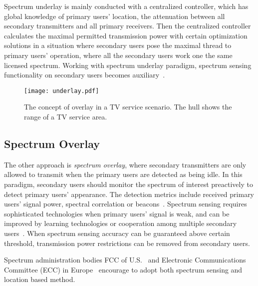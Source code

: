 Spectrum underlay is mainly conducted with a centralized controller, which has global knowledge of primary users' location, the attenuation between all secondary transmitters and all primary receivers.
Then the centralized controller calculates the maximal permitted transmission power with certain optimization solutions in a situation where secondary users pose the maximal thread to primary users' operation, where all the secondary users work one the same licensed spectrum.
Working with spectrum underlay paradigm, spectrum sensing functionality on secondary users becomes auxiliary~\cite{FCC_2010_sedond_memorandumm, ecc159}.
\begin{figure}[h!]
  \centering
  \texttt{[image: underlay.pdf]}
  \caption{The concept of overlay in a TV service scenario. The hull shows the range of a TV service area.}
\label{underlay}
\end{figure}


\subsection{Spectrum Overlay}
The other approach is \textit{spectrum overlay}, where secondary transmitters are only allowed to transmit when the primary users are detected as being idle.
In this paradigm, secondary users should monitor the spectrum of interest preactively to detect primary users' appearance.
The detection metrics include received primary users' signal power, spectral correlation or beacons~\cite{crnsensing_09}.
Spectrum sensing requires sophisticated technologies when primary users' signal is weak, and can be improved by learning technologies or cooperation among multiple secondary users~\cite{coorperativeSensing_Akyildiz11}.
When spectrum sensing accuracy can be guaranteed above certain threshold, transmission power restrictions can be removed from  secondary users.


%


Spectrum administration bodies FCC of U.S.~\cite{FCC_2010_sedond_memorandumm} and Electronic Communications Committee (ECC) in Europe~\cite{ecc159} encourage to adopt both spectrum sensing and location based method.


